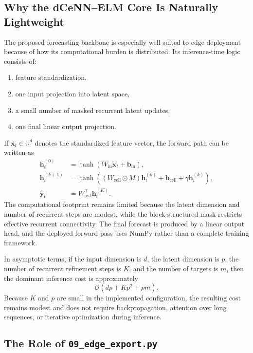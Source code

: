 \subsection{Why the dCeNN--ELM Core Is Naturally Lightweight}

The proposed forecasting backbone is especially well suited to edge deployment because of how its computational burden is distributed. Its inference-time logic consists of:
\begin{enumerate}
	\item feature standardization,
	\item one input projection into latent space,
	\item a small number of masked recurrent latent updates,
	\item one final linear output projection.
\end{enumerate}
If $\tilde{\mathbf{x}}_t \in \mathbb{R}^{d}$ denotes the standardized feature vector, the forward path can be written as
\begin{align}
	\mathbf{h}_t^{(0)} &= \tanh(W_{\mathrm{in}}\tilde{\mathbf{x}}_t + \mathbf{b}_{\mathrm{in}}), \\
	\mathbf{h}_t^{(k+1)} &=
	\tanh\!\left(
	(W_{\mathrm{cell}}\odot M)\mathbf{h}_t^{(k)} + \mathbf{b}_{\mathrm{cell}} + \gamma \mathbf{h}_t^{(k)}
	\right), \\
	\hat{\mathbf{y}}_t &= W_{\mathrm{out}}^{\top}\mathbf{h}_t^{(K)}.
	\label{eq:edge_forward}
\end{align}
The computational footprint remains limited because the latent dimension and number of recurrent steps are modest, while the block-structured mask restricts effective recurrent connectivity. The final forecast is produced by a linear output head, and the deployed forward pass uses NumPy rather than a complete training framework.

In asymptotic terms, if the input dimension is $d$, the latent dimension is $p$, the number of recurrent refinement steps is $K$, and the number of targets is $m$, then the dominant inference cost is approximately
\begin{equation}
	\mathcal{O}(dp + Kp^2 + pm).
	\label{eq:edge_complexity}
\end{equation}
Because $K$ and $p$ are small in the implemented configuration, the resulting cost remains modest and does not require backpropagation, attention over long sequences, or iterative optimization during inference.

\subsection{The Role of \texttt{09\_edge\_export.py}}

